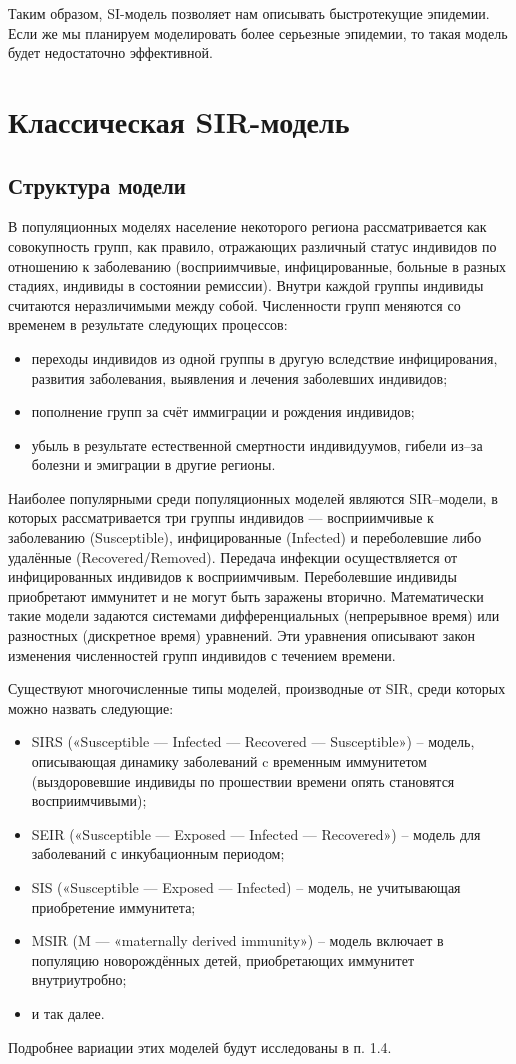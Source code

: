 \documentclass[a4paper, 14pt]{extreport}
\begin{document}
	Таким образом, SI-модель позволяет нам описывать быстротекущие эпидемии. Если же мы планируем моделировать более серьезные эпидемии, то такая модель будет недостаточно эффективной.
	
	
	\section{Классическая SIR-модель}
	\subsection{Структура модели}
	В популяционных моделях население некоторого региона рассматривается как совокупность групп, как правило, отражающих различный статус индивидов по отношению к заболеванию (восприимчивые, инфицированные, больные в разных стадиях, индивиды в состоянии ремиссии). Внутри каждой группы индивиды считаются неразличимыми между собой. Численности групп меняются со временем в результате следующих процессов:
	\begin{itemize}
		\item переходы индивидов из одной группы в другую вследствие
		инфицирования, развития заболевания, выявления и лечения заболевших
		индивидов;
		\item пополнение групп за счёт иммиграции и рождения индивидов;
		\item убыль в результате естественной смертности индивидуумов, гибели из–за
		болезни и эмиграции в другие регионы.
	\end{itemize}
	Наиболее популярными среди популяционных моделей являются SIR–модели, в которых рассматривается три группы индивидов --- восприимчивые к заболеванию (Susceptible), инфицированные (Infected) и переболевшие либо удалённые
	(Recovered/Removed). Передача инфекции осуществляется от инфицированных
	индивидов к восприимчивым. Переболевшие индивиды приобретают
	иммунитет и не могут быть заражены вторично. Математически такие модели
	задаются системами дифференциальных (непрерывное время) или разностных
	(дискретное время) уравнений. Эти уравнения описывают закон изменения
	численностей групп индивидов с течением времени.
	
	Существуют многочисленные типы моделей, производные от SIR, среди
	которых можно назвать следующие:
	\begin{itemize}
		\item SIRS («Susceptible — Infected — Recovered — Susceptible») – модель,
		описывающая динамику заболеваний c временным иммунитетом
		(выздоровевшие индивиды по прошествии времени опять становятся
		восприимчивыми);
		\item SEIR («Susceptible — Exposed — Infected — Recovered») – модель для
		заболеваний с инкубационным периодом;
		\item SIS («Susceptible — Exposed — Infected) – модель, не учитывающая
		приобретение иммунитета;
		\item MSIR (M — «maternally derived immunity») – модель включает в
		популяцию новорождённых детей, приобретающих иммунитет
		внутриутробно;
		\item и так далее.
	\end{itemize}
	Подробнее вариации этих моделей будут исследованы в п. 1.4.
\end{document}
